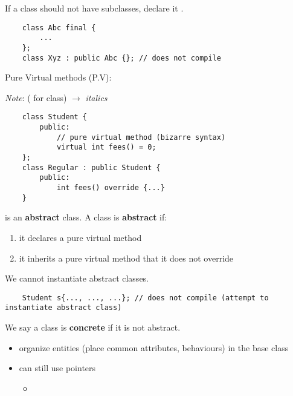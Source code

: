If a class should not have subclasses, declare it .
\begin{lstlisting}
    class Abc final {
        ...
    };
    class Xyz : public Abc {}; // does not compile
\end{lstlisting}

Pure Virtual methods (P.V):
\begin{figure}[H]
    \centering
\end{figure}

\emph{Note}:  ( for class) $ \rightarrow $ \emph{italics}

\begin{lstlisting}
    class Student {
        public:
            // pure virtual method (bizarre syntax)
            virtual int fees() = 0;
    };
    class Regular : public Student {
        public:
            int fees() override {...}
    }
\end{lstlisting}

 is an \textbf{abstract} class. A class is \textbf{abstract}
if:
\begin{enumerate}[label=(\arabic*)]
    \item it declares a pure virtual method
    \item it inherits a pure virtual method that it does not override
\end{enumerate}
We cannot instantiate abstract classes.
\begin{lstlisting}
    Student s{..., ..., ...}; // does not compile (attempt to instantiate abstract class)
\end{lstlisting}
We say a class is \textbf{concrete} if it is not abstract.
\begin{itemize}
    \item organize entities (place common attributes, behaviours)
          in the base class
    \item can still use  pointers
          \begin{itemize}
              \item {}
          \end{itemize}
\end{itemize}
